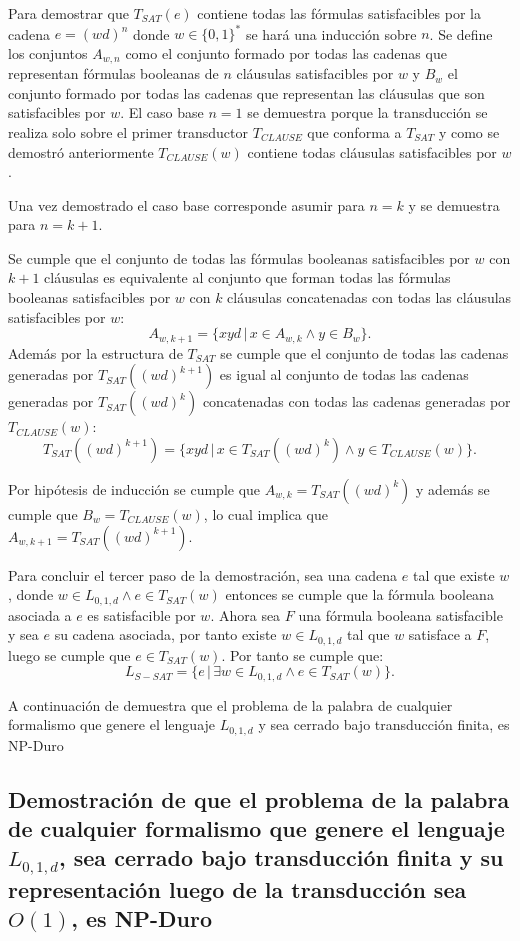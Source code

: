 Para demostrar que $T_{SAT}(e)$ contiene todas las fórmulas satisfacibles por la cadena $e=(wd)^n$ donde
$w\in\{0,1\}^*$ se hará una inducción sobre $n$. Se define los conjuntos $A_{w,n}$ como el conjunto
formado por todas las cadenas que representan fórmulas booleanas de $n$ cláusulas satisfacibles por
$w$ y $B_w$ el conjunto formado por todas las cadenas que representan las cláusulas que son satisfacibles
por $w$. El caso base $n=1$ se demuestra porque la transducción se realiza solo sobre el primer transductor
$T_{CLAUSE}$ que conforma a $T_{SAT}$ y como se demostró anteriormente $T_{CLAUSE}(w)$ contiene todas cláusulas satisfacibles por $w$.

Una vez demostrado el caso base corresponde asumir para $n=k$ y se demuestra para $n=k+1$.

Se cumple que
el conjunto de todas las fórmulas booleanas satisfacibles por $w$ con $k+1$ cláusulas es equivalente
al conjunto que forman todas las fórmulas booleanas satisfacibles por $w$ con $k$ cláusulas concatenadas con todas
las cláusulas satisfacibles por $w$:
$$A_{w,k+1}=\{xyd\,|\,x\in A_{w,k} \wedge y\in B_w\}.$$
Además por la estructura de $T_{SAT}$ se cumple que el conjunto de todas las cadenas
generadas por $T_{SAT}((wd)^{k+1})$ es igual al conjunto de todas las cadenas
generadas por $T_{SAT}((wd)^{k})$ concatenadas con todas las cadenas generadas por $T_{CLAUSE}(w)$:
$$T_{SAT}((wd)^{k+1})=\{xyd\,|\,x\in T_{SAT}((wd)^{k}) \wedge y\in T_{CLAUSE}(w)\}.$$

Por hipótesis de inducción se cumple que $A_{w,k}=T_{SAT}((wd)^{k})$ y además se cumple que $B_w=T_{CLAUSE}(w)$, lo cual implica que $A_{w,k+1}=T_{SAT}((wd)^{k+1})$.

Para concluir el tercer paso de la demostración, sea una cadena $e$ tal que existe $w$, donde $w \in L_{0,1,d} \wedge e \in T_{SAT}(w)$ entonces
se cumple que la fórmula booleana asociada a $e$ es satisfacible por $w$. Ahora sea $F$ una fórmula
booleana satisfacible y sea $e$ su cadena asociada, por tanto existe $w\in L_{0,1,d}$ tal que $w$ satisface a $F$, luego se cumple que $e\in T_{SAT}(w)$. Por tanto se cumple que:
$$L_{S-SAT} = \{e\,|\,\exists w \in L_{0,1,d} \wedge e \in T_{SAT}(w) \}.$$

A continuación de demuestra que el problema de la palabra de cualquier formalismo que genere el lenguaje $L_{0,1,d}$ y sea cerrado bajo transducción finita, es NP-Duro


\subsection{Demostración de que el problema de la palabra de cualquier formalismo que genere el lenguaje $L_{0,1,d}$, sea cerrado bajo transducción finita y su representación luego de la transducción sea $O(1)$, es NP-Duro}

